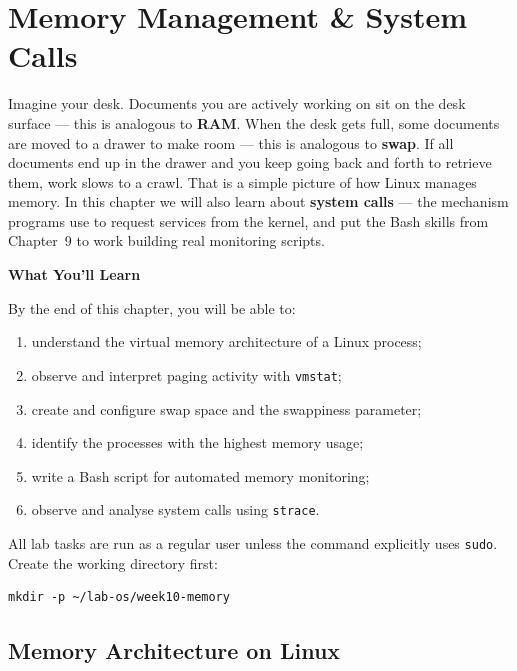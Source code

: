 \chapter{Memory Management \& System Calls}
\label{ch:memory-and-syscalls}

Imagine your desk. Documents you are actively working on sit on the desk surface
--- this is analogous to \textbf{RAM}. When the desk gets full, some documents
are moved to a drawer to make room --- this is analogous to \textbf{swap}. If
all documents end up in the drawer and you keep going back and forth to retrieve
them, work slows to a crawl. That is a simple picture of how Linux manages memory.
In this chapter we will also learn about \textbf{system calls} --- the mechanism
programs use to request services from the kernel, and put the Bash skills from
Chapter~9 to work building real monitoring scripts.

\textbf{What You'll Learn}

By the end of this chapter, you will be able to:

\begin{enumerate}
    \item understand the virtual memory architecture of a Linux process;
    \item observe and interpret paging activity with \texttt{vmstat};
    \item create and configure swap space and the swappiness parameter;
    \item identify the processes with the highest memory usage;
    \item write a Bash script for automated memory monitoring;
    \item observe and analyse system calls using \texttt{strace}.
\end{enumerate}

\begin{notebox}
All lab tasks are run as a regular user unless the command explicitly uses
\texttt{sudo}. Create the working directory first:
\begin{lstlisting}
mkdir -p ~/lab-os/week10-memory
\end{lstlisting}
\end{notebox}

\section{Memory Architecture on Linux}

